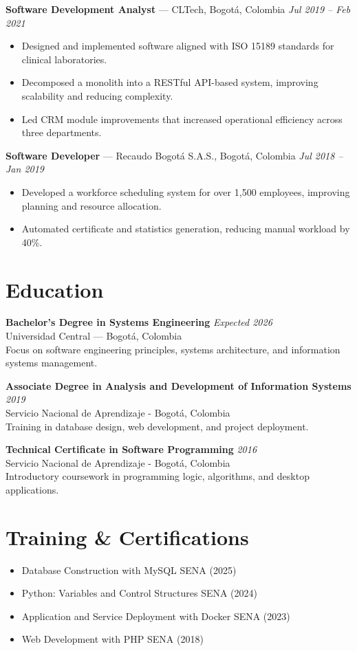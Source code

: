 \documentclass[10.5pt,letterpaper]{article}
\begin{document}
	\textbf{Software Development Analyst} — CLTech, Bogotá, Colombia
	\hfill
	\textit{Jul 2019 – Feb 2021}
	\begin{itemize}
		\item Designed and implemented software aligned with ISO 15189 standards for clinical laboratories.
		\item Decomposed a monolith into a RESTful API-based system, improving scalability and reducing complexity.
		\item Led CRM module improvements that increased operational efficiency across three departments.
	\end{itemize}
	
	\textbf{Software Developer} — Recaudo Bogotá S.A.S., Bogotá, Colombia  
	\hfill
	\textit{Jul 2018 – Jan 2019}
	\begin{itemize}
		\item Developed a workforce scheduling system for over 1,500 employees, improving planning and resource allocation.
		\item Automated certificate and statistics generation, reducing manual workload by 40\%.
	\end{itemize}
	
	\section*{Education}
	
	\textbf{Bachelor's Degree in Systems Engineering} \hfill \textit{Expected 2026} \\  
	Universidad Central — Bogotá, Colombia \\
	Focus on software engineering principles, systems architecture, and information systems management.
	
	\textbf{Associate Degree in Analysis and Development of Information Systems} \hfill \textit{2019} \\  
	Servicio Nacional de Aprendizaje - Bogotá, Colombia \\
	Training in database design, web development, and project deployment.
	
	\textbf{Technical Certificate in Software Programming} \hfill \textit{2016} \\
	Servicio Nacional de Aprendizaje - Bogotá, Colombia \\
	Introductory coursework in programming logic, algorithms, and desktop applications.
	
	\section*{Training \& Certifications}
	\begin{itemize}
		\item Database Construction with MySQL \hfill SENA (2025)
		\item Python: Variables and Control Structures \hfill SENA (2024)
		\item Application and Service Deployment with Docker \hfill SENA (2023)
		\item Web Development with PHP \hfill SENA (2018)
	\end{itemize}
	
\end{document}
